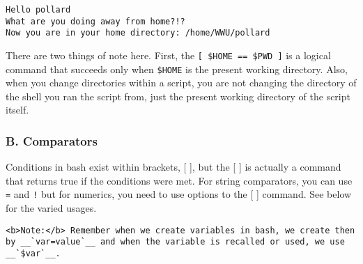 \documentclass[11pt]{article}
\begin{document}
    \begin{Verbatim}[commandchars=\\\{\}]
Hello pollard
What are you doing away from home?!?
Now you are in your home directory: /home/WWU/pollard

    \end{Verbatim}

    There are two things of note here. First, the
\texttt{{[}\ \$HOME\ ==\ \$PWD\ {]}} is a logical command that succeeds
only when \texttt{\$HOME} is the present working directory. Also, when
you change directories within a script, you are not changing the
directory of the shell you ran the script from, just the present working
directory of the script itself.

    \subsubsection{B. Comparators}\label{b.-comparators}

Conditions in bash exist within brackets, {[} {]}, but the {[} {]} is
actually a command that returns true if the conditions were met. For
string comparators, you can use \texttt{=} and \texttt{!} but for
numerics, you need to use options to the {[} {]} command. See below for
the varied usages.

    \begin{verbatim}
<b>Note:</b> Remember when we create variables in bash, we create then by __`var=value`__ and when the variable is recalled or used, we use __`$var`__.
\end{verbatim}
\end{document}
